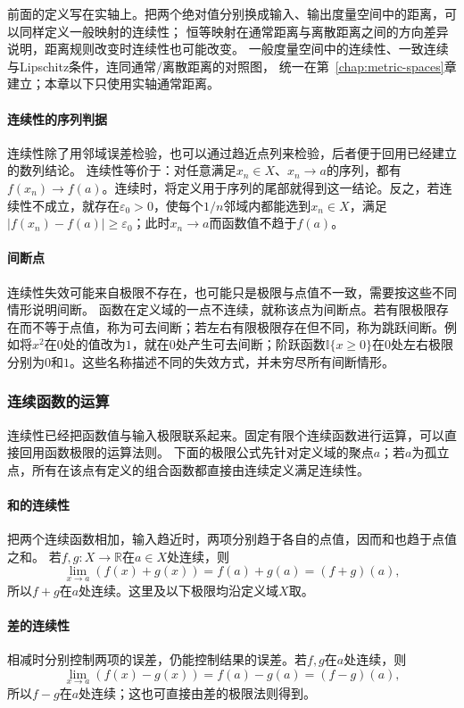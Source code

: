 前面的定义写在实轴上。把两个绝对值分别换成输入、输出度量空间中的距离，可以同样定义一般映射的连续性；
恒等映射在通常距离与离散距离之间的方向差异说明，距离规则改变时连续性也可能改变。
一般度量空间中的连续性、一致连续与Lipschitz条件，连同通常/离散距离的对照图，
统一在第~\ref{chap:metric-spaces}章建立；本章以下只使用实轴通常距离。

\paragraph{连续性的序列判据}
连续性除了用邻域误差检验，也可以通过趋近点列来检验，后者便于回用已经建立的数列结论。
连续性等价于：对任意满足$x_n\in X$、$x_n\to a$的序列，都有$f(x_n)\to f(a)$。连续时，将定义用于序列的尾部就得到这一结论。反之，若连续性不成立，就存在$\varepsilon_0>0$，使每个$1/n$邻域内都能选到$x_n\in X$，满足$|f(x_n)-f(a)|\geq\varepsilon_0$；此时$x_n\to a$而函数值不趋于$f(a)$。

\paragraph{间断点}
连续性失效可能来自极限不存在，也可能只是极限与点值不一致，需要按这些不同情形说明间断。
函数在定义域的一点不连续，就称该点为间断点。若有限极限存在而不等于点值，称为可去间断；若左右有限极限存在但不同，称为跳跃间断。例如将$x^2$在$0$处的值改为$1$，就在$0$处产生可去间断；阶跃函数$\mathbb I\{x\geq0\}$在$0$处左右极限分别为$0$和$1$。这些名称描述不同的失效方式，并未穷尽所有间断情形。

\subsubsection{连续函数的运算}

连续性已经把函数值与输入极限联系起来。固定有限个连续函数进行运算，可以直接回用函数极限的运算法则。
下面的极限公式先针对定义域的聚点$a$；若$a$为孤立点，所有在该点有定义的组合函数都直接由连续定义满足连续性。

\paragraph{和的连续性}
把两个连续函数相加，输入趋近时，两项分别趋于各自的点值，因而和也趋于点值之和。
若$f,g:X\to\mathbb R$在$a\in X$处连续，则
\[
 \lim_{x\to a}(f(x)+g(x))=f(a)+g(a)=(f+g)(a),
\]
所以$f+g$在$a$处连续。这里及以下极限均沿定义域$X$取。

\paragraph{差的连续性}
相减时分别控制两项的误差，仍能控制结果的误差。若$f,g$在$a$处连续，则
\[
 \lim_{x\to a}(f(x)-g(x))=f(a)-g(a)=(f-g)(a),
\]
所以$f-g$在$a$处连续；这也可直接由差的极限法则得到。

